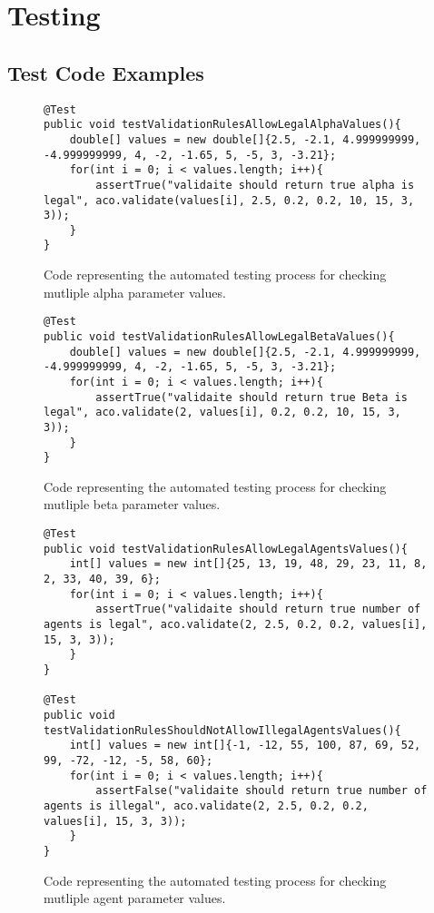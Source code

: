 \chapter{Testing}
\renewcommand{\thechapter}{\Alph{chapter}}

\section{Test Code Examples}

\begin{figure}[H]
\begin{lstlisting}
@Test
public void testValidationRulesAllowLegalAlphaValues(){
	double[] values = new double[]{2.5, -2.1, 4.999999999, -4.999999999, 4, -2, -1.65, 5, -5, 3, -3.21};
	for(int i = 0; i < values.length; i++){
		assertTrue("validaite should return true alpha is legal", aco.validate(values[i], 2.5, 0.2, 0.2, 10, 15, 3, 3));
	}
}
\end{lstlisting}
\caption{Code representing the automated testing process for checking mutliple alpha parameter values.}
\label{testAlpha}
\end{figure}

\begin{figure}[H]
\begin{lstlisting}
@Test
public void testValidationRulesAllowLegalBetaValues(){
	double[] values = new double[]{2.5, -2.1, 4.999999999, -4.999999999, 4, -2, -1.65, 5, -5, 3, -3.21};
	for(int i = 0; i < values.length; i++){
		assertTrue("validaite should return true Beta is legal", aco.validate(2, values[i], 0.2, 0.2, 10, 15, 3, 3));
	}
}
\end{lstlisting}
\caption{Code representing the automated testing process for checking mutliple beta parameter values.}
\label{testBeta}
\end{figure}

\begin{figure}[H]
\begin{lstlisting}
@Test
public void testValidationRulesAllowLegalAgentsValues(){
	int[] values = new int[]{25, 13, 19, 48, 29, 23, 11, 8, 2, 33, 40, 39, 6};
	for(int i = 0; i < values.length; i++){
		assertTrue("validaite should return true number of agents is legal", aco.validate(2, 2.5, 0.2, 0.2, values[i], 15, 3, 3));
	}
}

@Test
public void testValidationRulesShouldNotAllowIllegalAgentsValues(){
	int[] values = new int[]{-1, -12, 55, 100, 87, 69, 52, 99, -72, -12, -5, 58, 60};
	for(int i = 0; i < values.length; i++){
		assertFalse("validaite should return true number of agents is illegal", aco.validate(2, 2.5, 0.2, 0.2, values[i], 15, 3, 3));
	}
}
\end{lstlisting}
\caption{Code representing the automated testing process for checking mutliple agent parameter values.}
\label{testAgent}
\end{figure}

